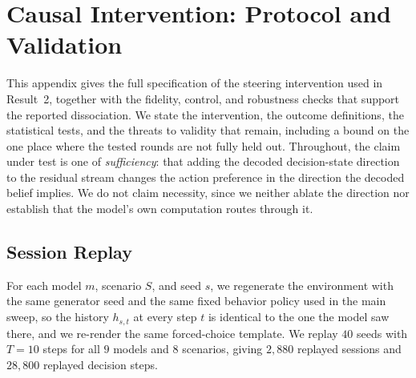 
\section{Causal Intervention: Protocol and Validation}
\label{app:steering}

This appendix gives the full specification of the steering intervention used in
Result~2, together with the fidelity, control, and robustness checks that
support the reported dissociation. We state the intervention, the outcome
definitions, the statistical tests, and the threats to validity that remain,
including a bound on the one place where the tested rounds are not fully
held out. Throughout, the claim under test is one of \emph{sufficiency}: that
adding the decoded decision-state direction to the residual stream changes the
action preference in the direction the decoded belief implies. We do not claim
necessity, since we neither ablate the direction nor establish that the model's
own computation routes through it.

\subsection{Session Replay}

For each model \(m\), scenario \(S\), and seed \(s\), we regenerate the
environment with the same generator seed and the same fixed behavior policy
used in the main sweep, so the history \(h_{s,t}\) at every step \(t\) is
identical to the one the model saw there, and we re-render the same
forced-choice template. We replay \(40\) seeds with \(T=10\) steps for all
\(9\) models and \(8\) scenarios, giving \(2{,}880\) replayed sessions and
\(28{,}800\) replayed decision steps.

